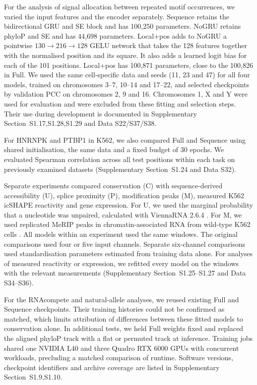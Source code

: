 \documentclass[webpdf,contemporary,large]{current_assets/oup-authoring-template}
\newcommand{\supsect}[1]{Supplementary Section~#1}
\begin{document}
For the analysis of signal allocation between repeated motif occurrences, we varied the input features and the encoder separately. Sequence retains the bidirectional GRU and SE block and has 100,250 parameters. NoGRU retains phyloP and SE and has 44,698 parameters. Local+pos adds to NoGRU a pointwise $130\rightarrow216\rightarrow128$ GELU network that takes the 128 features together with the normalised position and its square. It also adds a learned logit bias for each of the 101 positions. Local+pos has 100,871 parameters, close to the 100,826 in Full. We used the same cell-specific data and seeds (11, 23 and 47) for all four models, trained on chromosomes 3--7, 10--14 and 17--22, and selected checkpoints by validation PCC on chromosomes 2, 9 and 16. Chromosomes 1, X and Y were used for evaluation and were excluded from these fitting and selection steps. Their use during development is documented in \supsect{S1.17,S1.28,S1.29} and Data S22/S37/S38.

For HNRNPK and PTBP1 in K562, we also compared Full and Sequence using shared initialisation, the same data and a fixed budget of 30 epochs. We evaluated Spearman correlation across all test positions within each task on previously examined datasets (\supsect{S1.24} and Data S32).

Separate experiments compared conservation (C) with sequence-derived accessibility (U), splice proximity (P), modification peaks (M), measured K562 icSHAPE reactivity and gene expression. For U, we used the marginal probability that a nucleotide was unpaired, calculated with ViennaRNA 2.6.4 \citep{lorenz2011vienna}. For M, we used replicated MeRIP peaks in chromatin-associated RNA from wild-type K562 cells \citep{dou2023rbfox2}. All models within an experiment used the same windows. The original comparisons used four or five input channels. Separate six-channel comparisons used standardisation parameters estimated from training data alone. For analyses of measured reactivity or expression, we refitted every model on the windows with the relevant measurements (\supsect{S1.25--S1.27} and Data S34--S36).

For the RNAcompete and natural-allele analyses, we reused existing Full and Sequence checkpoints. Their training histories could not be confirmed as matched, which limits attribution of differences between these fitted models to conservation alone. In additional tests, we held Full weights fixed and replaced the aligned phyloP track with a flat or permuted track at inference. Training jobs shared one NVIDIA L40 and three Quadro RTX 6000 GPUs with concurrent workloads, precluding a matched comparison of runtime. Software versions, checkpoint identifiers and archive coverage are listed in \supsect{S1.9,S1.10}.
\end{document}
